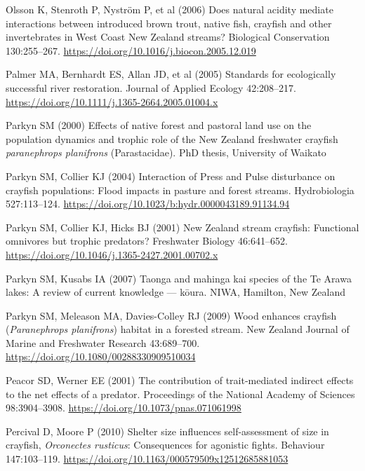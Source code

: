 \documentclass[
  12pt,
  a4paper,
  oneside]{scrbook}
\newlength{\cslhangindent}
\newenvironment{CSLReferences}[2] %
 {\begin{list}{}{%
  \setlength{\itemindent}{0pt}
  \setlength{\leftmargin}{0pt}
  \setlength{\parsep}{0pt}
  \ifodd #1
   \setlength{\leftmargin}{\cslhangindent}
   \setlength{\itemindent}{-1\cslhangindent}
  \fi
  \setlength{\itemsep}{#2\baselineskip}}}
 {\end{list}}
\begin{document}
\begin{CSLReferences}{1}{1}
Olsson K, Stenroth P, Nyström P, et al (2006) Does natural acidity
mediate interactions between introduced brown trout, native fish,
crayfish and other invertebrates in {West Coast New Zealand} streams?
Biological Conservation 130:255--267.
\url{https://doi.org/10.1016/j.biocon.2005.12.019}

Palmer MA, Bernhardt ES, Allan JD, et al (2005) Standards for
ecologically successful river restoration. Journal of Applied Ecology
42:208--217. \url{https://doi.org/10.1111/j.1365-2664.2005.01004.x}

Parkyn SM (2000) Effects of native forest and pastoral land use on the
population dynamics and trophic role of the {New Zealand} freshwater
crayfish \emph{paranephrops planifrons} ({Parastacidae}). PhD thesis,
University of Waikato

Parkyn SM, Collier KJ (2004) Interaction of {Press} and {Pulse}
disturbance on crayfish populations: Flood impacts in pasture and forest
streams. Hydrobiologia 527:113--124.
\url{https://doi.org/10.1023/b:hydr.0000043189.91134.94}

Parkyn SM, Collier KJ, Hicks BJ (2001) {New Zealand} stream crayfish:
Functional omnivores but trophic predators? Freshwater Biology
46:641--652. \url{https://doi.org/10.1046/j.1365-2427.2001.00702.x}

Parkyn SM, Kusabs IA (2007) Taonga and mahinga kai species of the {Te
Arawa} lakes: A review of current knowledge --- kōura. NIWA, Hamilton,
New Zealand

Parkyn SM, Meleason MA, Davies-Colley RJ (2009) Wood enhances crayfish
({\emph{Paranephrops planifrons}}) habitat in a forested stream. New
Zealand Journal of Marine and Freshwater Research 43:689--700.
\url{https://doi.org/10.1080/00288330909510034}

Peacor SD, Werner EE (2001) The contribution of trait-mediated indirect
effects to the net effects of a predator. Proceedings of the National
Academy of Sciences 98:3904--3908.
\url{https://doi.org/10.1073/pnas.071061998}

Percival D, Moore P (2010) Shelter size influences self-assessment of
size in crayfish, {\emph{Orconectes rusticus}}: Consequences for
agonistic fights. Behaviour 147:103--119.
\url{https://doi.org/10.1163/000579509x12512685881053}


\end{CSLReferences}
\end{document}
